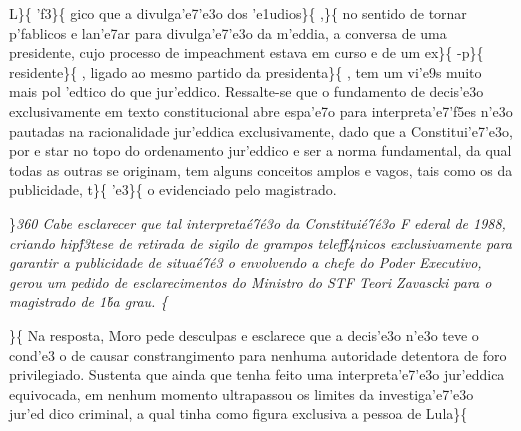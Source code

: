 L\}\{\rtlch{}  \ltrch{}  'f3\}\{\rtlch{}
 \ltrch{}  gico que a
divulga'e7'e3o dos 'e1udios\}\{\rtlch{}  \ltrch{}
 ,\}\{\rtlch{}  \ltrch{}
 no sentido de tornar p'fablicos e
lan'e7ar para divulga'e7'e3o da m'eddia, a conversa de uma presidente,
cujo processo de impeachment estava em curso e de um ex\}\{\rtlch{}
 \ltrch{}  -p\}\{ \rtlch{}  \ltrch{}
 residente\}\{\rtlch{} 
\ltrch{}  , ligado ao mesmo partido da
presidenta\}\{\rtlch{}  \ltrch{}
 , tem um vi'e9s muito mais pol 'edtico
do que jur'eddico. Ressalte-se que o fundamento de decis'e3o
exclusivamente em texto constitucional abre espa'e7o para
interpreta'e7'f5es n'e3o pautadas na racionalidade jur'eddica
exclusivamente, dado que a Constitui'e7'e3o, por e star no topo do
ordenamento jur'eddico e ser a norma fundamental, da qual todas as
outras se originam, tem alguns conceitos amplos e vagos, tais como os da
publicidade, t\}\{\rtlch{}  \ltrch{} 
'e3\}\{\rtlch{}  \ltrch{}  o
evidenciado pelo magistrado.
\par \}\pard \ltrpar\qj {}\sl360\widctlpar\wrapdefault\faauto{} {\rtlch{}  \ltrch{}  Cabe esclarecer que tal interpreta\'e7\'e3o da Constitui\'e7\'e3o F
ederal de 1988, criando hip\'f3tese de retirada de sigilo de grampos telef\'f4nicos exclusivamente para garantir a publicidade de situa\'e7\'e3
o envolvendo a chefe do Poder Executivo, gerou um pedido de esclarecimentos do Ministro do STF Teori Zavascki para o magistrado de 1\'ba grau. }\{\rtlch{}
 \ltrch{}  \par \}\{\rtlch{}  \ltrch{}
 Na resposta, Moro pede desculpas e
esclarece que a decis'e3o n'e3o teve o cond'e3 o de causar
constrangimento para nenhuma autoridade detentora de foro privilegiado.
Sustenta que ainda que tenha feito uma interpreta'e7'e3o jur'eddica
equivocada, em nenhum momento ultrapassou os limites da investiga'e7'e3o
jur'ed dico criminal, a qual tinha como figura exclusiva a pessoa de
Lula\}\{\rtlch{}  \ltrch{} \super{}
